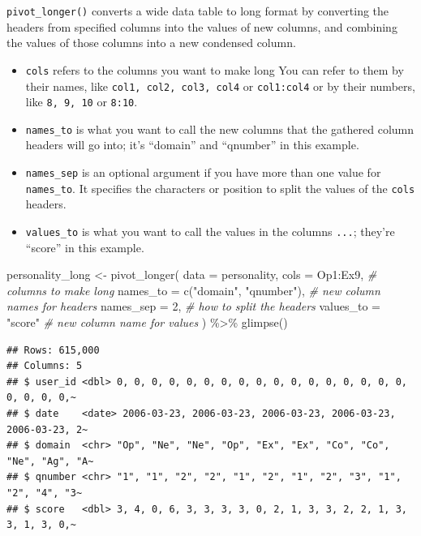 \documentclass[
  oneside]{book}
\newenvironment{Shaded}{\begin{snugshade}}{\end{snugshade}}
\newcommand{\AttributeTok}[1]{\textcolor[rgb]{0.77,0.63,0.00}{#1}}
\newcommand{\CommentTok}[1]{\textcolor[rgb]{0.56,0.35,0.01}{\textit{#1}}}
\newcommand{\DecValTok}[1]{\textcolor[rgb]{0.00,0.00,0.81}{#1}}
\newcommand{\FunctionTok}[1]{\textcolor[rgb]{0.00,0.00,0.00}{#1}}
\newcommand{\NormalTok}[1]{#1}
\newcommand{\OtherTok}[1]{\textcolor[rgb]{0.56,0.35,0.01}{#1}}
\newcommand{\SpecialCharTok}[1]{\textcolor[rgb]{0.00,0.00,0.00}{#1}}
\newcommand{\StringTok}[1]{\textcolor[rgb]{0.31,0.60,0.02}{#1}}
\providecommand{\tightlist}{%
  \setlength{\itemsep}{0pt}\setlength{\parskip}{0pt}}
\begin{document}
\texttt{pivot\_longer()} converts a wide data table to long format by converting the headers from specified columns into the values of new columns, and combining the values of those columns into a new condensed column.

\begin{itemize}
\tightlist
\item
  \texttt{cols} refers to the columns you want to make long You can refer to them by their names, like \texttt{col1,\ col2,\ col3,\ col4} or \texttt{col1:col4} or by their numbers, like \texttt{8,\ 9,\ 10} or \texttt{8:10}.
\item
  \texttt{names\_to} is what you want to call the new columns that the gathered column headers will go into; it's ``domain'' and ``qnumber'' in this example.
\item
  \texttt{names\_sep} is an optional argument if you have more than one value for \texttt{names\_to}. It specifies the characters or position to split the values of the \texttt{cols} headers.
\item
  \texttt{values\_to} is what you want to call the values in the columns \texttt{...}; they're ``score'' in this example.
\end{itemize}

\begin{Shaded}
\begin{Highlighting}[]
\NormalTok{personality\_long }\OtherTok{\textless{}{-}} \FunctionTok{pivot\_longer}\NormalTok{(}
  \AttributeTok{data =}\NormalTok{ personality, }
  \AttributeTok{cols =}\NormalTok{ Op1}\SpecialCharTok{:}\NormalTok{Ex9,                    }\CommentTok{\# columns to make long }
  \AttributeTok{names\_to =} \FunctionTok{c}\NormalTok{(}\StringTok{"domain"}\NormalTok{, }\StringTok{"qnumber"}\NormalTok{), }\CommentTok{\# new column names for headers}
  \AttributeTok{names\_sep =} \DecValTok{2}\NormalTok{,                     }\CommentTok{\# how to split the headers}
  \AttributeTok{values\_to =} \StringTok{"score"}                \CommentTok{\# new column name for values}
\NormalTok{) }\SpecialCharTok{\%\textgreater{}\%}
  \FunctionTok{glimpse}\NormalTok{()}
\end{Highlighting}
\end{Shaded}

\begin{verbatim}
## Rows: 615,000
## Columns: 5
## $ user_id <dbl> 0, 0, 0, 0, 0, 0, 0, 0, 0, 0, 0, 0, 0, 0, 0, 0, 0, 0, 0, 0, 0,~
## $ date    <date> 2006-03-23, 2006-03-23, 2006-03-23, 2006-03-23, 2006-03-23, 2~
## $ domain  <chr> "Op", "Ne", "Ne", "Op", "Ex", "Ex", "Co", "Co", "Ne", "Ag", "A~
## $ qnumber <chr> "1", "1", "2", "2", "1", "2", "1", "2", "3", "1", "2", "4", "3~
## $ score   <dbl> 3, 4, 0, 6, 3, 3, 3, 3, 0, 2, 1, 3, 3, 2, 2, 1, 3, 3, 1, 3, 0,~
\end{verbatim}
\end{document}
